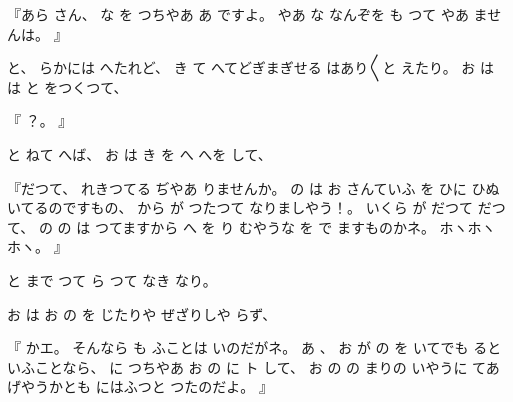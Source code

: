 『あら
さん、
な
を
つちやあ
あ
ですよ。
やあ
な
なんぞを
も
つて
やあ
ませんは。
』

と、
らかには
へたれど、
き
て
へてどぎまぎせる
はあり〳〵と
えたり。
お
は
は
と
をつくつて、

『
？。
』

と
ねて
へば、
お
は
き
を
へ
へを
して、

『だつて、
れきつてる
ぢやあ
りませんか。
の
は
お
さんていふ
を
ひに
ひぬいてるのですもの、
から
が
つたつて
なりましやう！。
いくら
が
だつて
だつて、
の
の
は
つてますから
へ
を
り
むやうな
を
で
ますものかネ。
ホヽホヽホヽ。
』

と
まで
つて
ら
つて
なき
なり。

お
は
お
の
を
じたりや
ぜざりしや
らず、

『
かエ。
そんなら
も
ふことは
いのだがネ。
あ
、
お
が
の
を
いてでも
るといふことなら、
に
つちやあ
お
の
に
ト
して、
お
の
の
まりの
いやうに
てあげやうかとも
にはふつと
つたのだよ。
』

